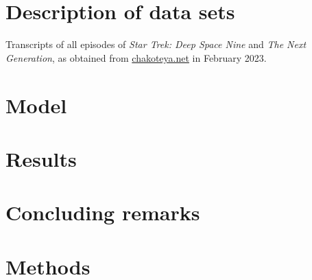 \section{Description of data sets}
\label{sec:papertag.data}

Transcripts of all episodes of \textit{Star Trek: Deep Space Nine} and \textit{The Next Generation}, as obtained from \href{http://chakoteya.net/DS9/episodes.htm}{chakoteya.net} in February 2023.

\section{Model}
\label{sec:papertag.model}

\section{Results}
\label{sec:papertag.results}


\section{Concluding remarks}
\label{sec:papertag.concludingremarks}


\section{Methods}
\label{sec:papertag.methods}

